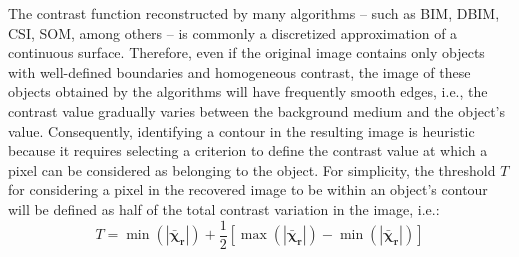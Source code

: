 \documentclass{IEEEtran}
\newcommand{\Xr}{\boldsymbol{\bar{\chi}_r}}
\begin{document}
			The contrast function reconstructed by many algorithms -- such as BIM, DBIM, CSI, SOM, among others -- is commonly a discretized approximation of a continuous surface. Therefore, even if the original image contains only objects with well-defined boundaries and homogeneous contrast, the image of these objects obtained by the algorithms will have frequently smooth edges, i.e., the contrast value gradually varies between the background medium and the object's value. Consequently, identifying a contour in the resulting image is heuristic because it requires selecting a criterion to define the contrast value at which a pixel can be considered as belonging to the object. For simplicity, the threshold $T$ for considering a pixel in the recovered image to be within an object's contour will be defined as half of the total contrast variation in the image, i.e.:
			\begin{equation}
				T = \min(|\Xr|) + \frac{1}{2} \left[\max(|\Xr|)-\min(|\Xr|)\right]
			\end{equation}
		
			
\end{document}
